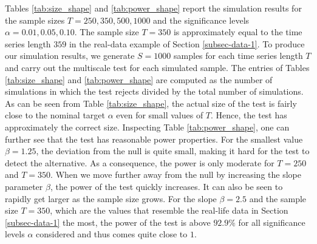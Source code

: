 \documentclass[a4paper,12pt]{article}
\begin{document}
%
%
%
%



Tables \ref{tab:size_shape} and \ref{tab:power_shape} report the simulation results for the sample sizes $T=250,350,500, 1000$ and the significance levels $\alpha = 0.01, 0.05, 0.10$. The sample size $T = 350$ is approximately equal to the time series length $359$ in the real-data example of Section \ref{subsec-data-1}. To produce our simulation results, we generate $S=1000$ samples for each time series length $T$ and carry out the multiscale test for each simulated sample. The entries of Tables \ref{tab:size_shape} and \ref{tab:power_shape} are computed as the number of simulations in which the test rejects divided by the total number of simulations. As can be seen from Table \ref{tab:size_shape}, the actual size of the test is fairly close to the nominal target $\alpha$ even for small values of $T$. Hence, the test has approximately the correct size. Inspecting Table \ref{tab:power_shape}, one can further see that the test has reasonable power properties. For the smallest value $\beta = 1.25$, the deviation from the null is quite small, making it hard for the test to detect the alternative. As a consequence, the power is only moderate for $T=250$ and $T=350$. When we move further away from the null by increasing the slope parameter $\beta$, the power of the test quickly increases. It can also be seen to rapidly get larger as the sample size grows. For the slope $\beta =2.5$ and the sample size $T=350$, which are the values that resemble the real-life data in Section \ref{subsec-data-1} the most, the power of the test is above $92.9\%$ for all significance levels $\alpha$ considered and thus comes quite close to $1$. 
\end{document}

